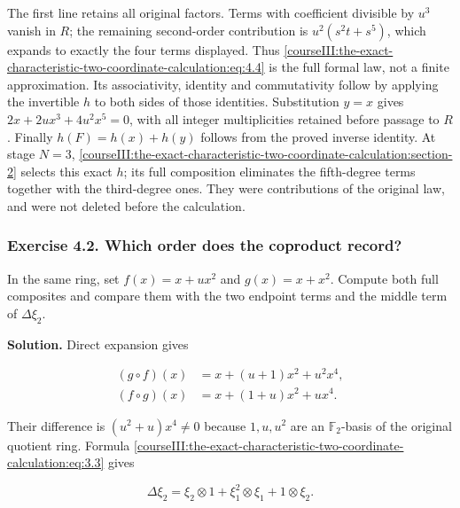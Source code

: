 The first line retains all original factors. Terms with coefficient divisible by \(u^3\) vanish in \(R\); the remaining second-order contribution is
\(u^2(s^2t+s^5)\), which expands to exactly the four terms displayed. Thus \eqref{courseIII:the-exact-characteristic-two-coordinate-calculation:eq:4.4} is the full formal law, not a finite approximation. Its associativity, identity and commutativity follow by applying the invertible \(h\) to both sides of those identities. Substitution \(y=x\) gives \(2x+2ux^3+4u^2x^5=0\), with all integer multiplicities retained before passage to \(R\). Finally \(h(F)=h(x)+h(y)\) follows from the proved inverse identity. At stage \(N=3\), \cref{courseIII:the-exact-characteristic-two-coordinate-calculation:section-2} selects this exact \(h\); its full composition eliminates the fifth-degree terms together with the third-degree ones. They were contributions of the original law, and were not deleted before the calculation.

\subsubsection{Exercise 4.2. Which order does the coproduct record?}
\label{courseIII:the-exact-characteristic-two-coordinate-calculation:exercise-4.2}

\label{courseIII:formal-char2:4.2}

In the same ring, set \(f(x)=x+ux^2\) and \(g(x)=x+x^2\). Compute both full composites and compare them with the two endpoint terms and the middle term of \(\Delta\xi_2\).

\textbf{Solution.} Direct expansion gives

\begin{equation}
\begin{aligned}
 (g\circ f)(x)&=x+(u+1)x^2+u^2x^4,\\
 (f\circ g)(x)&=x+(1+u)x^2+ux^4.
\end{aligned}
 \label{courseIII:the-exact-characteristic-two-coordinate-calculation:eq:4.5}
\end{equation}

Their difference is \((u^2+u)x^4\neq0\) because \(1,u,u^2\) are an \(\mathbb F_2\)-basis of the original quotient ring. Formula \eqref{courseIII:the-exact-characteristic-two-coordinate-calculation:eq:3.3} gives

\begin{equation}
\Delta\xi_2=\xi_2\otimes1+\xi_1^2\otimes\xi_1+1\otimes\xi_2.
 \label{courseIII:the-exact-characteristic-two-coordinate-calculation:eq:4.6}
\end{equation}

